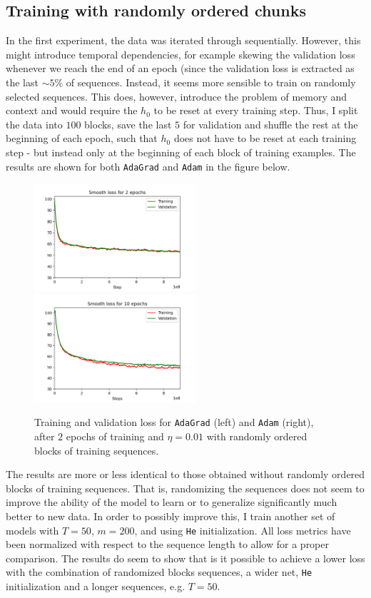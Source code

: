 \documentclass{article}
\begin{document}
\subsection*{Training with randomly ordered chunks}
	In the first experiment, the data was iterated through sequentially. However, this might introduce temporal dependencies, for example skewing the validation loss whenever we reach the end of an epoch (since the validation loss is extracted as the last $\sim5$\% of sequences. Instead, it seems more sensible to train on randomly selected sequences. This does, however, introduce the problem of memory and context and would require the $h_0$ to be reset at every training step. Thus, I split the data into $100$ blocks, save the last $5$ for validation and shuffle the rest at the beginning of each epoch, such that $h_0$ does not have to be reset at each training step - but instead only at the beginning of each block of training examples. The results are shown for both \texttt{AdaGrad} and \texttt{Adam} in the figure below.
	\begin{figure}[h!]
		\centering
		\includegraphics[width=6cm]{../plots/rnn_loss_v3.png}
		\includegraphics[width=6cm]{../plots/rnn_loss_v4.png}
		\caption{Training and validation loss for \texttt{AdaGrad} (left) and \texttt{Adam} (right), after $2$ epochs of training and $\eta = 0.01$ with randomly ordered blocks of training sequences.}
 	\end{figure}
	The results are more or less identical to those obtained without randomly ordered blocks of training sequences. That is, randomizing the sequences does not seem to improve the ability of the model to learn or to generalize significantly much better to new data. In order to possibly improve this, I train another set of models with $T=50$,  $m = 200$, and using \texttt{He} initialization. All loss metrics have been normalized with respect to the sequence length to allow for a proper comparison. The results do seem to show that is it possible to achieve a lower loss with the combination of randomized blocks sequences, a wider net, \texttt{He} initialization and a longer sequences, e.g. $T = 50$.
\end{document}

